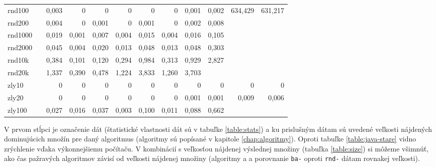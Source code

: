 \begin{landscape}
\begin{table}[h]
{\begin{tabular}{l|rrrrrrrrrrr}
		rnd100  &       & 0,003  & 0       & 0        & 0        & 0        & 0       & 0,001  & 0,002      & 634,429 & 631,217 \\
		rnd200  &       & 0,004  & 0       & 0,001    & 0        & 0,001    & 0       & 0,002  & 0,008      &         &         \\
		rnd1000 &       & 0,019  & 0,001   & 0,007    & 0,004    & 0,015    & 0,004   & 0,016  & 0,105      &         &         \\
		rnd2000 &       & 0,045  & 0,004   & 0,020    & 0,013    & 0,048    & 0,013   & 0,048  & 0,303      &         &         \\
		rnd10k  &       & 0,384  & 0,101   & 0,120    & 0,294    & 0,984    & 0,313   & 0,929  & 2,827      &         &         \\
		rnd20k  &       & 1,337  & 0,390   & 0,478    & 1,224    & 3,833    & 1,260   & 3,703  &            &         &         \\
		zly10   &       & 0      & 0       & 0        & 0        & 0        & 0       & 0      & 0          & 0       & 0       \\
		zly20   &       & 0      & 0       & 0        & 0        & 0        & 0       & 0,001  & 0,001      & 0,009   & 0,006   \\
		zly100  &       & 0,027  & 0,016   & 0,037    & 0,003    & 0,100    & 0,011   & 0,088  & 0,662      &         &         \\ \hline
	\end{tabular}
}
	\smallskip \par
	{\footnotesize
	V prvom stĺpci je označenie dát (štatistické vlastnosti dát sú v tabuľke 
	\ref{table:stats}) a ku prislušným dátam sú uvedené veľkosti nájdených 
	dominujúcich množín pre daný algoritmus (algoritmy sú popísané v kapitole 
	\ref{chap:algoritmy}). Oproti tabuľke \ref{table:java-stare} vidno 
	zrýchlenie vďaka výkonnejšiemu počítaču. V kombinácií s veľkosťou nájdenej 
	výslednej množiny (tabuľka \ref{table:size}) si môžeme všimnúť, ako čas 
	pažravých algoritmov závisí od veľkosti nájdenej množiny (algoritmy 
	 a  a porovnanie \texttt{ba-} oproti \texttt{rnd-} 
	dátam rovnakej veľkosti).}
	\label{table:java}
\end{table}
\end{landscape}

